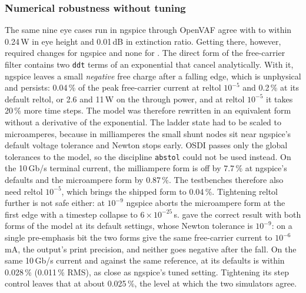 \subsubsection{Numerical robustness without tuning}
The same nine eye cases run in ngspice through OpenVAF agree with \vas{} to within
0.24\,\textmu W in eye height and 0.01\,dB in extinction ratio. Getting there, however, required
changes for ngspice and none for \vas{}. The direct form of the free-carrier filter contains
two \texttt{ddt} terms of an exponential that cancel analytically. With it, ngspice leaves a
small \emph{negative} free charge after a falling edge, which is unphysical and persists:
0.04\,\% of the peak free-carrier current at reltol $10^{-5}$ and 0.2\,\% at its default
reltol, or 2.6 and 11\,\textmu W on the through power, and at reltol $10^{-5}$ it takes
20\,\% more time steps.
The model was therefore rewritten in an equivalent form without a derivative of the
exponential. The ladder state had
to be scaled to microamperes, because in milliamperes the small shunt nodes sit near ngspice's
default voltage tolerance and Newton stops early. OSDI passes only the global tolerances to the
model, so the discipline \texttt{abstol} could not be used instead. On the 10\,Gb/s terminal
current, the milliampere form is off by 7.7\,\% at ngspice's defaults and the microampere form by
0.87\,\%. The testbenches therefore also need reltol $10^{-5}$, which brings the shipped form to
0.04\,\%. Tightening reltol further is not safe either: at $10^{-9}$ ngspice aborts the
microampere form at the first edge with a timestep collapse to $6\times10^{-25}$\,s.
\vas{} gave the correct result with both forms of the model at its default
settings, whose Newton tolerance is $10^{-9}$: on a single pre-emphasis bit the two forms give
the same free-carrier current to $10^{-6}$\,mA, the output's print precision, and neither goes
negative after the fall.
On the same 10\,Gb/s current and against the same reference, \vas{} at its defaults is within
0.028\,\% (0.011\,\% RMS), as close as ngspice's tuned setting. Tightening its step control
leaves that at about 0.025\,\%, the level at which the two simulators agree.


